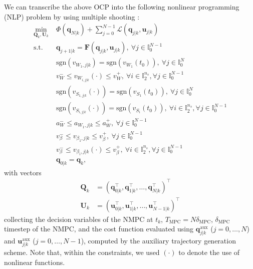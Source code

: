 We can transcribe the above OCP into the following nonlinear programming (NLP)
problem by using multiple shooting \cite{Bock1984MultipleShooting}:
\begin{equation*}
    \begin{aligned}
        \min_{\bm{Q}_k, \bm{U}_k} \;
            & \Phi(\bm{q}_{N|k}) + \sum_{j=0}^{N-1} \mathcal{L}(\bm{q}_{j|k}, \bm{u}_{j|k}) \\
            \text{s.t. } & \bm{q}_{j+1|k} = \bm{F}(\bm{q}_{j|k}, \bm{u}_{j|k}),\: \forall j \in \mathbb{I}_0^{N-1} \\
                         & \mathrm{sgn}(v_{W_1,j|k}) = \mathrm{sgn}(v_{W_1}(t_0)),\: \forall j \in \mathbb{I}_0^N \\
                         & v_W^- \le v_{W_{i,j|k}}(\cdot) \le v_W^+,\: \forall i \in \mathbb{I}_2^{n_s}, \forall j \in \mathbb{I}_0^{N-1} \\
                         & \mathrm{sgn}(v_{S_{1,j|k}}(\cdot)) = \mathrm{sgn}(v_{S_1}(t_0)),\: \forall j \in \mathbb{I}_0^N \\
                         & \mathrm{sgn}(v_{S_{i,j|k}}(\cdot)) = \mathrm{sgn}(v_{S_i}(t_0)),\: \forall i \in \mathbb{I}_2^{n_s}, \forall j \in \mathbb{I}_0^{N-1} \\
                         & a_W^- \le a_{W_1,j|k} \le a_W^+,\: \forall j \in \mathbb{I}_0^{N-1} \\
                         & v_{\beta}^- \le v_{\beta_1,j|k} \le v_{\beta}^+,\: \forall j \in \mathbb{I}_0^{N-1} \\
                         & v_{\beta}^- \le v_{\beta_i,j|k}(\cdot) \le v_{\beta}^+,\: \forall i \in \mathbb{I}_2^{n_s}, \forall j \in \mathbb{I}_0^{N-1} \\
                         & \bm{q}_{0|k} = \bm{q}_k,
    \end{aligned}
\end{equation*}
with vectors
\begin{align*}
\bm{Q}_k &= (\bm{q}_{0|k}^\top, \bm{q}_{1|k}^\top, \dots, \bm{q}_{N|k}^\top)^\top \\
\bm{U}_k &= (\bm{u}_{0|k}^\top, \bm{u}_{1|k}^\top, \dots, \bm{u}_{N-1|k}^\top)^\top
\end{align*}
collecting the decision variables of the NMPC at $t_k$,
$T_{\mathrm{MPC}}=N\delta_{\mathrm{MPC}}$, $\delta_{\mathrm{MPC}}$ timestep of
the NMPC, and the cost function evaluated using
$\bm{q}_{j|k}^{\mathrm{aux}}$ ($j = 0, \dots, N$) and
$\bm{u}_{j|k}^{\mathrm{aux}}$ ($j = 0, \dots, N - 1$), computed by the auxiliary
trajectory generation scheme. Note that, within the constraints, we used
$(\cdot)$ to denote the use of nonlinear functions.

